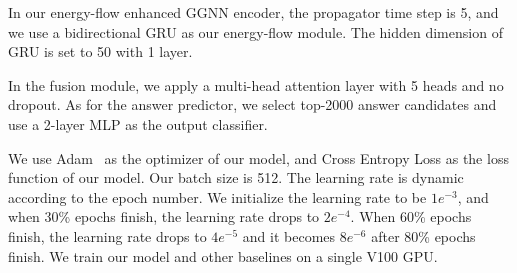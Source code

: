 \documentclass[letterpaper]{article} %
\begin{document}
In our energy-flow enhanced GGNN encoder, the propagator time step is 5, and we use a bidirectional GRU as our energy-flow module. The hidden dimension of GRU is set to 50 with 1 layer. 

In the fusion module, we apply a multi-head attention layer with 5 heads and no dropout. 
As for the answer predictor, we select top-2000 answer candidates and use a 2-layer MLP as the output classifier.

We use Adam~\cite{kingma2014adam} as the optimizer of our model, and Cross Entropy Loss as the loss function of our model. Our batch size is 512. The learning rate is dynamic according to the epoch number. We initialize the learning rate to be $1e^{-3}$, and when 30\% epochs finish, the learning rate drops to $2e^{-4}$. When 60\%
epochs finish, the learning rate drops to $4e^{-5}$ and it becomes $8e^{-6}$ after 80\% epochs finish. We train our model and other baselines on a single V100 GPU.

\end{document}
